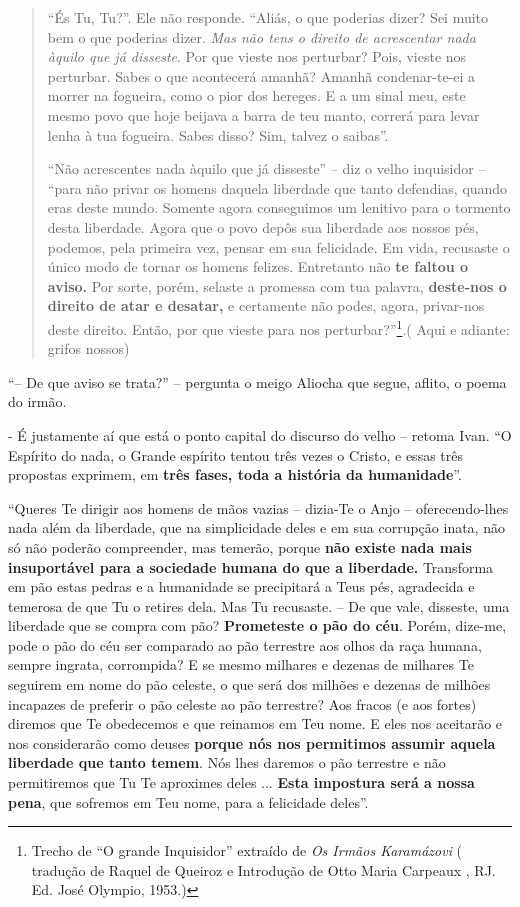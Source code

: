 \begin{quote}
``És Tu, Tu?''. Ele não responde. ``Aliás, o que poderias dizer? Sei
muito bem o que poderias dizer. \emph{Mas não tens o direito de
acrescentar nada àquilo que já disseste}. Por que vieste nos perturbar?
Pois, vieste nos perturbar. Sabes o que acontecerá amanhã? Amanhã
condenar-te-ei a morrer na fogueira, como o pior dos hereges. E a um
sinal meu, este mesmo povo que hoje beijava a barra de teu manto,
correrá para levar lenha à tua fogueira. Sabes disso? Sim, talvez o
saibas''.

``Não acrescentes nada àquilo que já disseste'' -- diz o velho
inquisidor -- ``para não privar os homens daquela liberdade que tanto
defendias, quando eras deste mundo. Somente agora conseguimos um
lenitivo para o tormento desta liberdade. Agora que o povo depôs sua
liberdade aos nossos pés, podemos, pela primeira vez, pensar em sua
felicidade. Em vida, recusaste o único modo de tornar os homens felizes.
Entretanto não \textbf{te faltou o aviso.} Por sorte, porém, selaste a
promessa com tua palavra, \textbf{deste-nos o direito de atar e
desatar,} e certamente não podes, agora, privar-nos deste direito.
Então, por que vieste para nos perturbar?''\footnote{Trecho de ``O
  grande Inquisidor'' extraído de \emph{Os Irmãos Karamázovi} ( tradução
  de Raquel de Queiroz e Introdução de Otto Maria Carpeaux , RJ. Ed.
  José Olympio, 1953.)}.( Aqui e adiante: grifos nossos)
\end{quote}

``-- De que aviso se trata?'' -- pergunta o meigo Aliocha que segue,
aflito, o poema do irmão.

- É justamente aí que está o ponto capital do discurso do velho --
retoma Ivan. ``O Espírito do nada, o Grande espírito tentou três vezes o
Cristo, e essas três propostas exprimem, em \textbf{três fases, toda a
história da humanidade}''.

``Queres Te dirigir aos homens de mãos vazias -- dizia-Te o Anjo --
oferecendo-lhes nada além da liberdade, que na simplicidade deles e em
sua corrupção inata, não só não poderão compreender, mas temerão, porque
\textbf{não existe nada mais insuportável para a sociedade humana do que
a liberdade.} Transforma em pão estas pedras e a humanidade se
precipitará a Teus pés, agradecida e temerosa de que Tu o retires dela.
Mas Tu recusaste. -- De que vale, disseste, uma liberdade que se compra
com pão? \textbf{Prometeste o pão do céu}. Porém, dize-me, pode o pão do
céu ser comparado ao pão terrestre aos olhos da raça humana, sempre
ingrata, corrompida? E se mesmo milhares e dezenas de milhares Te
seguirem em nome do pão celeste, o que será dos milhões e dezenas de
milhões incapazes de preferir o pão celeste ao pão terrestre? Aos fracos
(e aos fortes) diremos que Te obedecemos e que reinamos em Teu nome. E
eles nos aceitarão e nos considerarão como deuses \textbf{porque nós nos
permitimos assumir aquela liberdade que tanto temem}. Nós lhes daremos o
pão terrestre e não permitiremos que Tu Te aproximes deles ...
\textbf{Esta impostura será a nossa pena}, que sofremos em Teu nome,
para a felicidade deles''.

